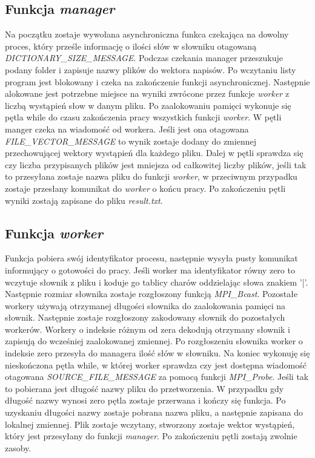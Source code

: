 \documentclass{article}
\begin{document}
\subsection{Funkcja \textit{manager}}
Na początku zostaje wywołana asynchroniczna funkca czekająca na dowolny proces, który prześle informację o ilości słów w słowniku otagowaną \textit{DICTIONARY\_SIZE\_MESSAGE}. Podczas czekania manager przeszukuje podany folder i zapisuje nazwy plików do wektora napisów. Po wczytaniu listy program jest blokowany i czeka na zakończenie funkcji asynchronicznej. Następnie alokowane jest potrzebne miejsce na wyniki zwrócone przez funkcje \textit{worker} z liczbą wystąpień słow w danym pliku. Po zaalokowaniu pamięci wykonuje się pętla while do czasu zakończenia pracy wszystkich funkcji \textit{worker}. W pętli manger czeka na wiadomość od workera. Jeśli jest ona otagowana \textit{FILE\_VECTOR\_MESSAGE} to wynik zostaje dodany do zmiennej przechowującej wektory wystąpień dla każdego pliku. Dalej w pętli sprawdza się czy liczba przypisanych plików jest mniejsza od całkowitej liczby plików, jeśli tak to przesyłana zostaje nazwa pliku do funkcji \textit{worker}, w przeciwnym przypadku zostaje przesłany komunikat do \textit{worker} o końcu pracy. Po zakończeniu pętli wyniki zostają zapisane do pliku \textit{result.txt}.

\subsection{Funkcja \textit{worker}}
Funkcja pobiera swój identyfikator procesu, następnie wysyła pusty komunikat informujący o gotowości do pracy. Jeśli worker ma identyfikator równy zero to wczytuje słownik z pliku i koduje go tablicy charów oddzielając słowa znakiem '|'. Następnie rozmiar słownika zostaje rozgłoszony funkcją \textit{MPI\_Bcast}. Pozostałe workery używają otrzymanej długości słownika do zaalokowania pamięci na słownik. Następnie zostaje rozgłoszony zakodowany słownik do pozostałych workerów. Workery o indeksie różnym od zera dekodują otrzymany słownik i zapisują do wcześniej zaalokowanej zmiennej. Po rozgłoszeniu słownika worker o indeksie zero przesyła do managera ilość słów w słowniku. Na koniec wykonuję się nieskończona pętla while, w której worker sprawdza czy jest dostępna wiadomość otagowana \textit{SOURCE\_FILE\_MESSAGE} za pomocą funkcji \textit{MPI\_Probe}. Jeśli tak to pobierana jest długość nazwy pliku do przetworzenia. W przypadku gdy długość nazwy wynosi zero pętla zostaje przerwana i kończy się funkcja. Po uzyskaniu długości nazwy zostaje pobrana nazwa pliku, a następnie zapisana do lokalnej zmiennej. Plik zostaje wczytany, stworzony zostaje wektor wystąpień, który jest przesyłany do funkcji \textit{manager}. Po zakończeniu pętli zostają zwolnie zasoby.
\end{document}

